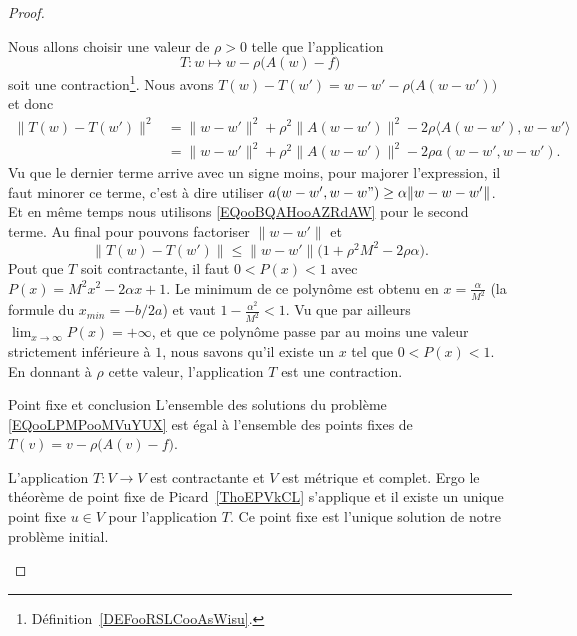 \begin{proof}
\begin{subproof}
                Nous allons choisir une valeur de \( \rho>0\) telle que l'application
                \begin{equation}
                    T\colon w\mapsto w-\rho\big( A(w)-f \big)
                \end{equation}
                soit une contraction\footnote{Définition~\ref{DEFooRSLCooAsWisu}.}. Nous avons \( T(w)-T(w')=w-w'-\rho\big( A(w-w') \big)\) et donc
                \begin{subequations}
                    \begin{align}
                        \| T(w)-T(w') \|^2&=\| w-w' \|^2+\rho^2\| A(w-w') \|^2-2\rho\langle A(w-w'), w-w'\rangle \\
                        &=\| w-w' \|^2+\rho^2\| A(w-w') \|^2-2\rho a(w-w',w-w').
                    \end{align}
                \end{subequations}
                Vu que le dernier terme arrive avec un signe moins, pour majorer l'expression, il faut minorer ce terme, c'est à dire utiliser \( a(w-w',w-w")\geq \alpha\| w-w-w' \|\). Et en même temps nous utilisons \eqref{EQooBQAHooAZRdAW} pour le second terme. Au final pour pouvons factoriser \( \| w-w' \|\) et
                \begin{equation}
                    \| T(w)-T(w') \|\leq \| w-w' \|\big( 1+\rho^2M^2-2\rho\alpha \big).
                \end{equation}
                Pout que \( T\) soit contractante, il faut \( 0<P(x)<1\) avec \( P(x)=M^2x^2-2\alpha x+1\). Le minimum de ce polynôme est obtenu en \( x=\frac{ \alpha }{ M^2 }\) (la formule du \( x_{min}=-b/2a\)) et vaut \( 1-\frac{ \alpha^2 }{ M^2 }<1\). Vu que par ailleurs \( \lim_{x\to \infty} P(x)=+\infty\), et que ce polynôme passe par au moins une valeur strictement inférieure à \( 1\), nous savons qu'il existe un \( x\) tel que \( 0<P(x)<1\). En donnant à \( \rho\) cette valeur, l'application \( T\) est une contraction.

            \item[Point fixe et conclusion]
                L'ensemble des solutions du problème \eqref{EQooLPMPooMVuYUX} est égal à l'ensemble des points fixes de \( T(v)=v-\rho\big( A(v)-f \big)\).

                L'application \( T\colon V\to V\) est contractante et \( V\) est métrique et complet. Ergo le théorème de point fixe de Picard~\ref{ThoEPVkCL} s'applique et il existe un unique point fixe \( u\in V\) pour l'application \( T\). Ce point fixe est l'unique solution de notre problème initial.


\end{subproof}
\end{proof}
